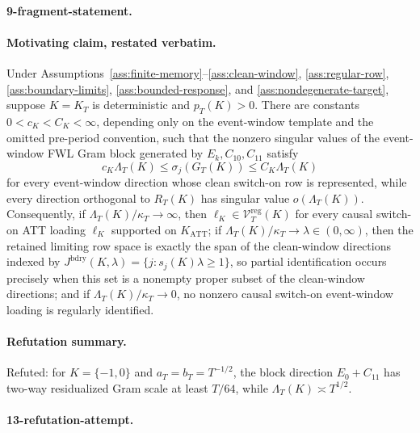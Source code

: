 \paragraph{9-fragment-statement.}
\paragraph{Motivating claim, restated verbatim.}
Under Assumptions~\ref{ass:finite-memory}--\ref{ass:clean-window}, \ref{ass:regular-row}, \ref{ass:boundary-limits}, \ref{ass:bounded-response}, and \ref{ass:nondegenerate-target}, suppose \(K=K_T\) is deterministic and \(p_T(K)>0\).
There are constants \(0<c_K<C_K<\infty\), depending only on the event-window template and the omitted pre-period convention, such that the nonzero singular values of the event-window FWL Gram block generated by \(E_k,C_{10},C_{11}\) satisfy
\[
c_K\Lambda_T(K)\le \sigma_j(G_T(K))\le C_K\Lambda_T(K)
\]
for every event-window direction whose clean switch-on row is represented, while every direction orthogonal to \(R_T(K)\) has singular value \(o(\Lambda_T(K))\).
Consequently, if \(\Lambda_T(K)/\kappa_T\to\infty\), then \(\ell_K\in\mathcal V_T^{\mathrm{reg}}(K)\) for every causal switch-on ATT loading \(\ell_K\) supported on \(K_{\mathrm{ATT}}\); if \(\Lambda_T(K)/\kappa_T\to\lambda\in(0,\infty)\), then the retained limiting row space is exactly the span of the clean-window directions indexed by \(J^{\mathrm{bdry}}(K,\lambda)=\{j:s_j(K)\lambda\ge1\}\), so partial identification occurs precisely when this set is a nonempty proper subset of the clean-window directions; and if \(\Lambda_T(K)/\kappa_T\to0\), no nonzero causal switch-on event-window loading is regularly identified.

\paragraph{Refutation summary.}
Refuted: for \(K=\{-1,0\}\) and \(a_T=b_T=T^{-1/2}\), the block direction \(E_0+C_{11}\) has two-way residualized Gram scale at least \(T/64\), while \(\Lambda_T(K)\asymp T^{1/2}\).

\paragraph{13-refutation-attempt.}
